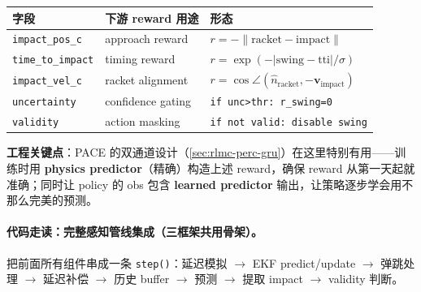 \begin{center}
\small
\begin{tabular}{@{}lll@{}}
\toprule
字段 & 下游 reward 用途 & 形态 \\
\midrule
\verb|impact_pos_c| & approach reward & $r=-\|\text{racket}-\text{impact}\|$ \\
\verb|time_to_impact| & timing reward & $r=\exp(-|\text{swing}-\text{tti}|/\sigma)$ \\
\verb|impact_vel_c| & racket alignment & $r=\cos\angle(\hat n_{\text{racket}},-\mathbf v_{\text{impact}})$ \\
\verb|uncertainty| & confidence gating & \verb|if unc>thr: r_swing=0| \\
\verb|validity| & action masking & \verb|if not valid: disable swing| \\
\bottomrule
\end{tabular}
\end{center}

\textbf{工程关键点}：PACE 的双通道设计（\cref{sec:rlmc-perc-gru}）在这里特别有用——训练时用 \textbf{physics predictor}（精确）构造上述 reward，确保 reward 从第一天起就准确；同时让 policy 的 obs 包含 \textbf{learned predictor} 输出，让策略逐步学会用不那么完美的预测。

\paragraph{代码走读：完整感知管线集成（三框架共用骨架）。}把前面所有组件串成一条 \verb|step()|：延迟模拟 $\to$ EKF predict/update $\to$ 弹跳处理 $\to$ 延迟补偿 $\to$ 历史 buffer $\to$ 预测 $\to$ 提取 impact $\to$ validity 判断。

